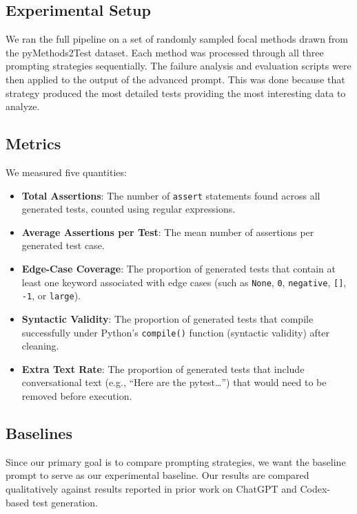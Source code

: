 \documentclass[conference]{IEEEtran}
\begin{document}
\subsection{Experimental Setup}

We ran the full pipeline on a set of randomly sampled focal methods drawn from the pyMethods2Test dataset. Each method was processed through all three prompting strategies sequentially. The failure analysis and evaluation scripts were then applied to the output of the advanced prompt. This was done because that strategy produced the most detailed tests providing the most interesting data to analyze.

\subsection{Metrics}

We measured five quantities:

\begin{itemize}[leftmargin=*]
    \item \textbf{Total Assertions}: The number of \texttt{assert} statements found across all generated tests, counted using regular expressions.
    \item \textbf{Average Assertions per Test}: The mean number of assertions per generated test case.
    \item \textbf{Edge-Case Coverage}: The proportion of generated tests that contain at least one keyword associated with edge cases (such as \texttt{None}, \texttt{0}, \texttt{negative}, \texttt{[]}, \texttt{-1}, or \texttt{large}).
    \item \textbf{Syntactic Validity}: The proportion of generated tests that compile successfully under Python's \texttt{compile()} function (syntactic validity) after cleaning.
    \item \textbf{Extra Text Rate}: The proportion of generated tests that include conversational text (e.g., ``Here are the pytest\ldots'') that would need to be removed before execution.
\end{itemize}

\subsection{Baselines}

Since our primary goal is to compare prompting strategies, we want the baseline prompt to serve as our experimental baseline. Our results are compared qualitatively against results reported in prior work on ChatGPT and Codex-based test generation.
\end{document}
